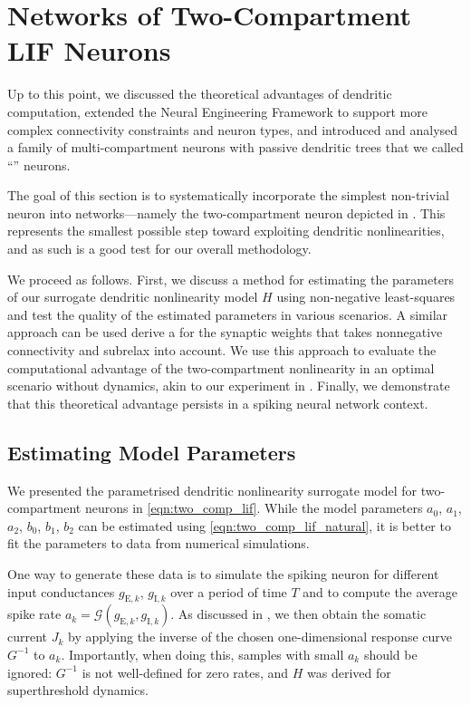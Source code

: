 
\section{Networks of Two-Compartment LIF Neurons}
\label{sec:two_comp_lif}

Up to this point, we discussed the theoretical advantages of dendritic computation, extended the Neural Engineering Framework to support more complex connectivity constraints and neuron types, and introduced and analysed a family of multi-compartment \LIF neurons with passive dendritic trees that we called \enquote{\nlif} neurons.

The goal of this section is to systematically incorporate the simplest non-trivial \nlif neuron into \NEF networks---namely the two-compartment \LIF neuron depicted in .
This represents the smallest possible step toward exploiting dendritic nonlinearities, and as such is a good test for our overall methodology.

We proceed as follows.
First, we discuss a method for estimating the parameters of our surrogate dendritic nonlinearity model $H$ using non-negative least-squares and test the quality of the estimated parameters in various scenarios.
A similar approach can be used derive a \qprog for the synaptic weights that takes nonnegative connectivity and \gls{subrelax} into account.
We use this approach to evaluate the computational advantage of the two-compartment \LIF nonlinearity in an optimal scenario without dynamics, akin to our experiment in .
Finally, we demonstrate that this theoretical advantage persists in a spiking neural network context.

\subsection{Estimating Model Parameters}
\label{sec:two_comp_lif_fit_model}

We presented the parametrised dendritic nonlinearity surrogate model for two-compartment \LIF neurons in \cref{eqn:two_comp_lif}.
While the model parameters $a_0$, $a_1$, $a_2$, $b_0$, $b_1$, $b_2$ can be estimated using \cref{eqn:two_comp_lif_natural}, it is better to fit the parameters to data from numerical simulations.

One way to generate these data is to simulate the spiking neuron for different input conductances $g_{\mathrm{E}, k}$, $g_{\mathrm{I}, k}$ over a period of time $T$ and to compute the average spike rate $a_k = \mathscr{G}( g_{\mathrm{E}, k}, g_{\mathrm{I}, k})$.
As discussed in , we then obtain the somatic current $J_k$ by applying the inverse of the chosen one-dimensional response curve $G^{-1}$ to $a_k$.
Importantly, when doing this, samples with small $a_k$ should be ignored: $G^{-1}$ is not well-defined for zero rates, and $H$ was derived for superthreshold dynamics.

